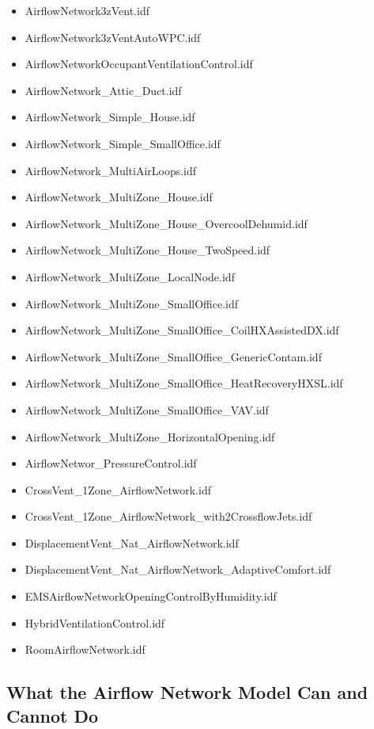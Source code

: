 \begin{itemize}
\item
  AirflowNetwork3zVent.idf
\item
  AirflowNetwork3zVentAutoWPC.idf
\item
  AirflowNetworkOccupantVentilationControl.idf
\item
  AirflowNetwork\_Attic\_Duct.idf
\item
  AirflowNetwork\_Simple\_House.idf
\item
  AirflowNetwork\_Simple\_SmallOffice.idf
\item
  AirflowNetwork\_MultiAirLoops.idf
\item
  AirflowNetwork\_MultiZone\_House.idf
\item
  AirflowNetwork\_MultiZone\_House\_OvercoolDehumid.idf
\item
  AirflowNetwork\_MultiZone\_House\_TwoSpeed.idf
\item
  AirflowNetwork\_MultiZone\_LocalNode.idf
\item
  AirflowNetwork\_MultiZone\_SmallOffice.idf
\item
  AirflowNetwork\_MultiZone\_SmallOffice\_CoilHXAssistedDX.idf
\item
  AirflowNetwork\_MultiZone\_SmallOffice\_GenericContam.idf
\item
  AirflowNetwork\_MultiZone\_SmallOffice\_HeatRecoveryHXSL.idf
\item
  AirflowNetwork\_MultiZone\_SmallOffice\_VAV.idf
\item
  AirflowNetwork\_MultiZone\_HorizontalOpening.idf
\item
  AirflowNetwor\_PressureControl.idf
\item
  CrossVent\_1Zone\_AirflowNetwork.idf
\item
  CrossVent\_1Zone\_AirflowNetwork\_with2CrossflowJets.idf
\item
  DisplacementVent\_Nat\_AirflowNetwork.idf
\item
  DisplacementVent\_Nat\_AirflowNetwork\_AdaptiveComfort.idf
\item
  EMSAirflowNetworkOpeningControlByHumidity.idf
\item
  HybridVentilationControl.idf
\item
  RoomAirflowNetwork.idf
\end{itemize}

\subsection{What the Airflow Network Model Can and Cannot Do}\label{what-the-airflow-network-model-can-and-cannot-do}

